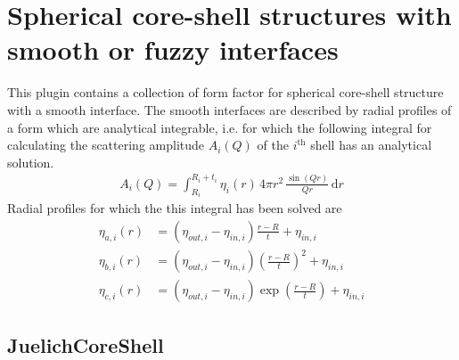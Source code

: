 \clearpage
\section{Spherical core-shell structures with smooth or fuzzy interfaces}
This plugin contains a collection of form factor for spherical core-shell structure with a smooth interface.
The smooth interfaces are described by radial profiles of a form which are analytical integrable, i.e. for which
the following integral for calculating the scattering amplitude $A_i(Q)$ of the $i^\textrm{th}$ shell
has an analytical solution.
\begin{align}
A_i(Q) = \int_{R_i}^{R_i+t_i} \eta_i(r)\, 4\pi r^2 \,\frac{\sin\left( Qr\right)}{Qr} \, \mathrm{d}r
\end{align}
Radial profiles for which the this integral has been solved are
\begin{subequations}
\begin{align}
\eta_{a,i}(r) &= \left(\eta_{out,i}-\eta_{in,i}\right)\frac{r-R}{t}+\eta_{in,i}\\
\eta_{b,i}(r) &= \left(\eta_{out,i}-\eta_{in,i}\right)\left(\frac{r-R}{t}\right)^2+\eta_{in,i}\\
\eta_{c,i}(r) &= \left(\eta_{out,i}-\eta_{in,i}\right)\exp\left(\frac{r-R}{t}\right)+\eta_{in,i}
\end{align}
\end{subequations}



\clearpage
\subsection{JuelichCoreShell} ~\\

